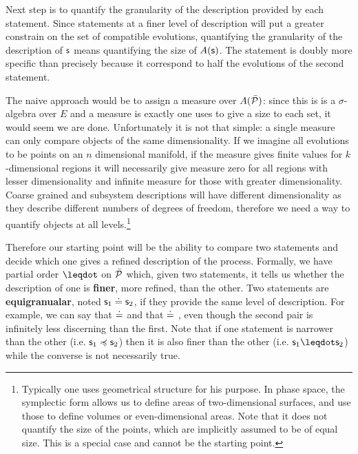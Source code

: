 \documentclass[letterpaper]{article}
\begin{document}
Next step is to quantify the granularity of the description provided by each statement. Since statements at a finer level of description will put a greater constrain on the set of compatible evolutions, quantifying the granularity of the description of $\stmt$ means quantifying the size of $A(\stmt)$. The statement  is doubly more specific than  precisely because it correspond to half the evolutions of the second statement.

The naive approach would be to assign a measure over $A(\tdomain[P])$: since this is is a $\sigma$-algebra over $E$ and a measure is exactly one uses to give a size to each set, it would seem we are done. Unfortunately it is not that simple: a single measure can only compare objects of the same dimensionality. If we imagine all evolutions to be points on an $n$ dimensional manifold, if the measure gives finite values for $k$-dimensional regions it will necessarily give measure zero for all regions with lesser dimensionality and infinite measure for those with greater dimensionality. Coarse grained and subsystem descriptions will have different dimensionality as they describe different numbers of degrees of freedom, therefore we need a way to quantify objects at all levels.\footnote{Typically one uses geometrical structure for his purpose. In phase space, the symplectic form allows us to define areas of two-dimensional surfaces, and use those to define volumes or even-dimensional areas. Note that it does not quantify the size of the points, which are implicitly assumed to be of equal size. This is a special case and cannot be the starting point.}

Therefore our starting point will be the ability to compare two statements and decide which one gives a refined description of the process. Formally, we have partial order $\finer$ on $\tdomain[P]$ which, given two statements, it tells us whether the description of one is \textbf{finer}, more refined, than the other. Two statements are \textbf{equigranualar}, noted $\stmt_1 \eqgran \stmt_2$, if they provide the same level of description. For example, we can say that  $\eqgran$  and that  $\eqgran$ , even though the second pair is infinitely less discerning than the first. Note that if one statement is narrower than the other (i.e. $\stmt_1 \narrower \stmt_2$) then it is also finer than the other (i.e. $\stmt_1 \finer \stmt_2$) while the converse is not necessarily true. 
\end{document}
